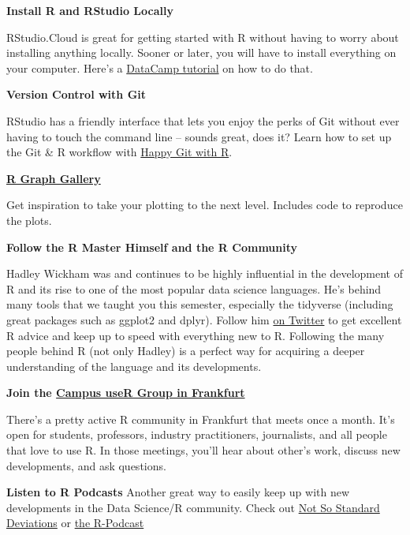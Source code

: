 \documentclass[
  11pt,
]{book}
\newenvironment{tips}[1]
  {
  \begin{itemize}
  \footnotesize
  \renewcommand{\labelitemi}{
    \raisebox{-.7\height}[0pt][0pt]{
      {\setkeys{Gin}{width=3em,keepaspectratio}
        \texttt{[image: images/\#1.png]}}
    }
  }
  \setlength{\fboxsep}{1em}
  \begin{rbox}
  \item
  }
  {
  \end{rbox}
  \end{itemize}
  }
\begin{document}
\begin{tips}r

\textbf{Install R and RStudio Locally}

RStudio.Cloud is great for getting started with R without having to worry about installing anything locally. Sooner or later, you will have to install everything on your computer. Here's a \href{https://www.datacamp.com/community/tutorials/installing-R-windows-mac-ubuntu}{DataCamp tutorial} on how to do that.

\textbf{Version Control with Git}

RStudio has a friendly interface that lets you enjoy the perks of Git without ever having to touch the command line -- sounds great, does it? Learn how to set up the Git \& R workflow with \href{https://happygitwithr.com/}{Happy Git with R}.

\textbf{\href{https://www.r-graph-gallery.com/}{R Graph Gallery}}

Get inspiration to take your plotting to the next level. Includes code to reproduce the plots.

\textbf{Follow the R Master Himself and the R Community}

Hadley Wickham was and continues to be highly influential in the development of R and its rise to one of the most popular data science languages. He's behind many tools that we taught you this semester, especially the tidyverse (including great packages such as ggplot2 and dplyr). Follow him \href{https://twitter.com/hadleywickham}{on Twitter} to get excellent R advice and keep up to speed with everything new to R. Following the many people behind R (not only Hadley) is a perfect way for acquiring a deeper understanding of the language and its developments.

\textbf{Join the \href{https://www.meetup.com/r-frankfurt/}{Campus useR Group in Frankfurt}}

There's a pretty active R community in Frankfurt that meets once a month. It's open for students, professors, industry practitioners, journalists, and all people that love to use R. In those meetings, you'll hear about other's work, discuss new developments, and ask questions.

\textbf{Listen to R Podcasts}
Another great way to easily keep up with new developments in the Data Science/R community. Check out
\href{http://nssdeviations.com/}{Not So Standard Deviations} or \href{https://r-podcast.org/}{the R-Podcast}

\end{tips}
\end{document}
